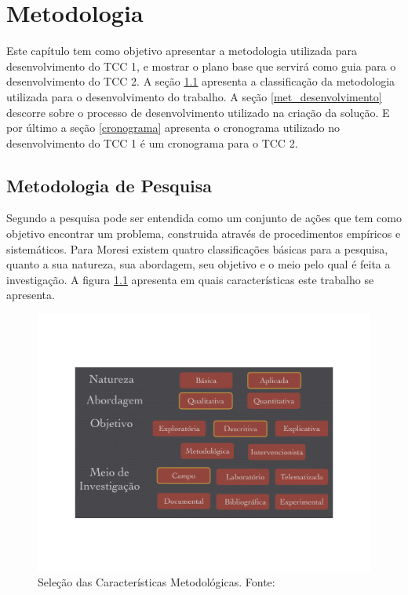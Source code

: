 \chapter[Metodologia]{Metodologia}
Este capítulo tem como objetivo apresentar a metodologia utilizada para desenvolvimento do TCC 1, e mostrar o plano base que servirá como guia para o desenvolvimento do TCC 2. A seção \ref{met_pesquisa} apresenta a classificação da metodologia utilizada para o desenvolvimento do trabalho. A seção \ref{met_desenvolvimento} descorre sobre o processo de desenvolvimento utilizado na criação da solução. E por último a seção  \ref{cronograma} apresenta o cronograma utilizado no desenvolvimento do TCC 1 é um cronograma para o TCC 2.

\section{Metodologia de Pesquisa}
\label{met_pesquisa}

Segundo \cite{moresi} a pesquisa pode ser entendida como um conjunto de ações que tem como objetivo encontrar um problema, construida através de procedimentos empíricos e sistemáticos. Para Moresi existem quatro classificações básicas para a pesquisa, quanto a sua natureza, sua abordagem, seu objetivo e o meio pelo qual é feita a investigação. A figura \ref{img:met_pesquisa} apresenta em quais características este trabalho se apresenta.

\graphicspath{{figuras/}}
\begin{figure}[h]
\centering
\includegraphics[scale=0.50]{metodologia_pesquisa}
\caption{Seleção das Características Metodológicas. Fonte: \cite{moresi}}
\label{img:met_pesquisa}
\end{figure}



